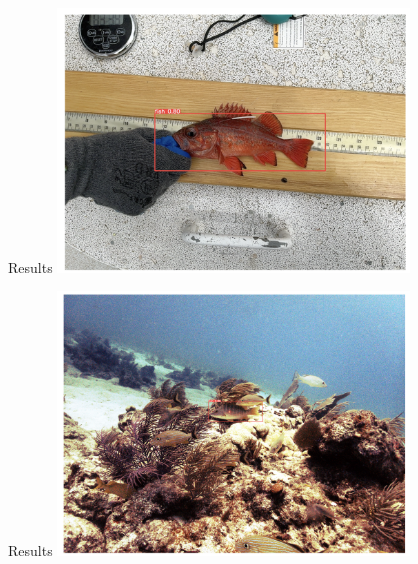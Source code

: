  \begin{frame}{Results}
    \centering
        \includegraphics[height=0.7\textheight,width=0.7\textwidth,keepaspectratio]{images/6.png}
    

 \end{frame}
 \begin{frame}{Results}
    \centering
        \includegraphics[height=0.7\textheight,width=0.7\textwidth,keepaspectratio]{images/7.png}
    

 \end{frame}




